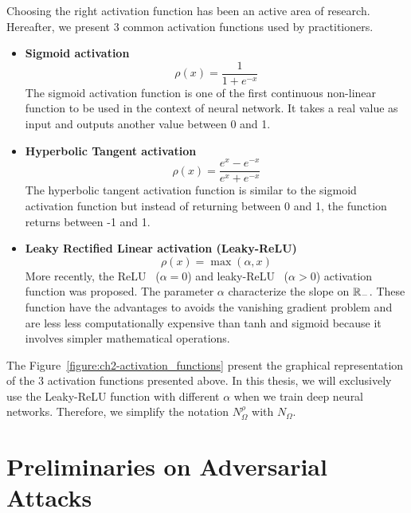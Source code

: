 Choosing the right activation function has been an active area of research. 
Hereafter, we present 3 common activation functions used by practitioners.
\begin{itemize}
  \item \textbf{Sigmoid activation} \cite{han1995influence}
    \begin{equation*}
      \rho(x) = \frac{1}{1+e^{-x}} 
    \end{equation*}
    The sigmoid activation function is one of the first continuous non-linear function to be used in the context of neural network. It takes a real value as input and outputs another value between 0 and 1.
  \item \textbf{Hyperbolic Tangent activation} \cite{karlik2011performance}
    \begin{equation*}
      \rho(x) = \frac{e^x - e^{-x}}{e^x + e^{-x}}
    \end{equation*}
    The hyperbolic tangent activation function is similar to the sigmoid activation function but instead of returning between 0 and 1, the function returns between -1 and 1.     
  \item \textbf{Leaky Rectified Linear activation (Leaky-ReLU)} \cite{maas2013rectifier}
    \begin{equation*}
      \rho(x) = \max(\alpha, x)
    \end{equation*}
    More recently, the ReLU~\cite{nair2010rectified} ($\alpha = 0$) and leaky-ReLU~\cite{maas2013rectifier} ($\alpha > 0$) activation function was proposed.
    The parameter $\alpha$ characterize the slope on $\mathbb{R}_-$.
    These function have the advantages to avoids the vanishing gradient problem and are less less computationally expensive than tanh and sigmoid because it involves simpler mathematical operations.
\end{itemize}

\noindent
The Figure~\ref{figure:ch2-activation_functions} present the graphical representation of the 3 activation functions presented above.
In this thesis, we will exclusively use the Leaky-ReLU function with different $\alpha$ when we train deep neural networks.
Therefore, we simplify the notation $N^\rho_\Omega$ with $N_\Omega$.




\section{Preliminaries on Adversarial Attacks}
\label{section:ch2-preliminaries_on_adversarial_attacks}

